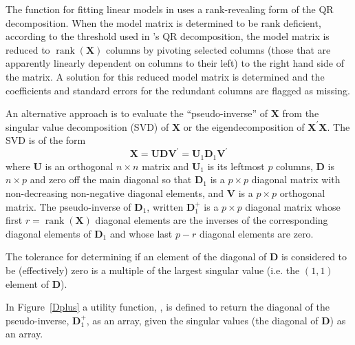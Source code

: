 \documentclass[shortnames,article]{jss}
\newcommand{\rank}{\operatorname{rank}}
\begin{document}
The  function for fitting linear models in  uses
a rank-revealing form of the QR decomposition.  When the model matrix
is determined to be rank deficient, according to the threshold used in
's QR decomposition, the model matrix is reduced to
$\rank{(\bm X)}$ columns by pivoting selected columns (those that are
apparently linearly dependent on columns to their left) to the right
hand side of the matrix.  A solution for this reduced model matrix is
determined and the coefficients and standard errors for the redundant
columns are flagged as missing.

An alternative approach is to evaluate the ``pseudo-inverse'' of $\bm
X$ from the singular value decomposition (SVD) of $\bm X$ or the
eigendecomposition of $\bm X^\prime\bm X$.  The SVD is of the form
\begin{displaymath}
  \bm X=\bm U\bm D\bm V^\prime=\bm U_1\bm D_1\bm V^\prime
\end{displaymath}
where $\bm U$ is an orthogonal $n\times n$ matrix and $\bm U_1$ is its
leftmost $p$ columns, $\bm D$ is $n\times p$ and zero off the main
diagonal so that $\bm D_1$ is a $p\times p$ diagonal matrix with
non-decreasing non-negative diagonal elements, and $\bm V$ is a $p\times
p$ orthogonal matrix.  The pseudo-inverse of $\bm D_1$, written $\bm
D_1^+$ is a $p\times p$ diagonal matrix whose first $r=\rank(\bm X)$
diagonal elements are the inverses of the corresponding diagonal
elements of $\bm D_1$ and whose last $p-r$ diagonal elements are zero.

The tolerance for determining if an element of the diagonal of $\bm D$
is considered to be (effectively) zero is a multiple of the largest
singular value (i.e. the $(1,1)$ element of $\bm D$).

In Figure~\ref{Dplus} a utility function, , is defined to
return the diagonal of the pseudo-inverse, $\bm D_1^+$, as an array,
given the singular values (the diagonal of $\bm D$) as an array.
\end{document}
